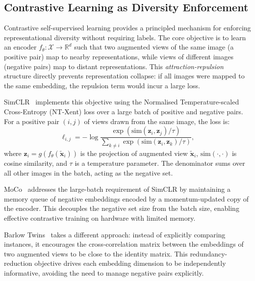 \subsection{Contrastive Learning as Diversity Enforcement}
\label{sec:25-background-synthetic-contrastive}

\begin{foldable}
  Contrastive self-supervised learning provides a principled mechanism for enforcing representational diversity without requiring labels.
  The core objective is to learn an encoder $f_\theta: \mathcal{X} \rightarrow \mathbb{R}^d$ such that two augmented views of the same image (a positive pair) map to nearby representations, while views of different images (negative pairs) map to distant representations.
  This \emph{attraction-repulsion} structure directly prevents representation collapse: if all images were mapped to the same embedding, the repulsion term would incur a large loss.
\end{foldable}

\begin{foldable}
  SimCLR~\cite{chen2020simple} implements this objective using the Normalised Temperature-scaled Cross-Entropy (NT-Xent) loss over a large batch of positive and negative pairs.
  For a positive pair $(i, j)$ of views drawn from the same image, the loss is:
  \begin{equation}
    \ell_{i,j} = -\log \frac{\exp(\mathrm{sim}(\mathbf{z}_i, \mathbf{z}_j) / \tau)}
    {\sum_{k \neq i} \exp(\mathrm{sim}(\mathbf{z}_i, \mathbf{z}_k) / \tau)},
    \label{eq:ntxent}
  \end{equation}
  where $\mathbf{z}_i = g(f_\theta(\tilde{\mathbf{x}}_i))$ is the projection of augmented view $\tilde{\mathbf{x}}_i$, $\mathrm{sim}(\cdot, \cdot)$ is cosine similarity, and $\tau$ is a temperature parameter.
  The denominator sums over all other images in the batch, acting as the negative set.
\end{foldable}

\begin{foldable}
  MoCo~\cite{he2020momentum} addresses the large-batch requirement of SimCLR by maintaining a memory queue of negative embeddings encoded by a momentum-updated copy of the encoder.
  This decouples the negative set size from the batch size, enabling effective contrastive training on hardware with limited memory.
\end{foldable}

\begin{foldable}
  Barlow Twins~\cite{zbontar2021barlow} takes a different approach: instead of explicitly comparing instances, it encourages the cross-correlation matrix between the embeddings of two augmented views to be close to the identity matrix.
  This redundancy-reduction objective drives each embedding dimension to be independently informative, avoiding the need to manage negative pairs explicitly.
\end{foldable}

